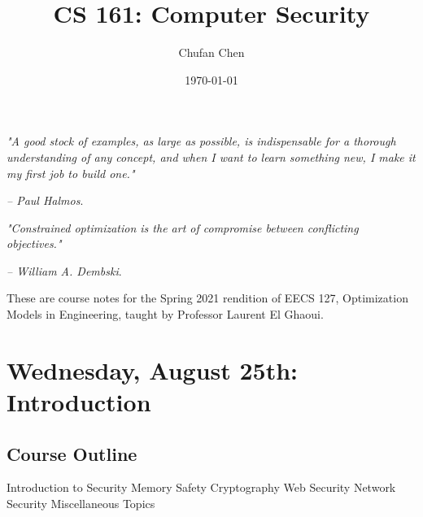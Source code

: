 \documentclass[11 pt]{scrartcl}
\begin{document}
 
\title{\Large CS 161: Computer Security}
\author{\large Chufan Chen}
\date{\large\today}

\maketitle 

\begin{center}
\begin{displayquote}
    \emph{"A good stock of examples, as large as possible, is indispensable for a thorough understanding of any concept, and when I want to learn something new, I make it my first job to build one."} \\ \begin{flushright} \emph{– Paul Halmos}.  \end{flushright}
\end{displayquote}
\begin{displayquote}
    \emph{"Constrained optimization is the art of compromise between conflicting objectives."} \\ \begin{flushright} \emph{– William A. Dembski}.  \end{flushright}
\end{displayquote}
\end{center}


These are course notes for the Spring 2021 rendition of EECS 127, Optimization Models in Engineering, taught by Professor Laurent El Ghaoui.

\tableofcontents 

\newpage

\section{Wednesday, August 25th: Introduction}
\subsection{Course Outline}
\itemnum
    \ii Introduction to Security
    \ii Memory Safety
    \ii Cryptography
    \ii Web Security
    \ii Network Security
    \ii Miscellaneous Topics
\itemend
\end{document}
